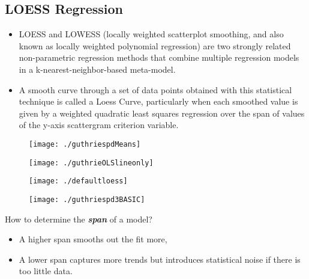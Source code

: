 \documentclass[12pt]{article}
\begin{document}
\newpage

\subsection*{LOESS Regression}

\begin{itemize}
\item LOESS and LOWESS (locally weighted scatterplot smoothing, and also known as locally weighted polynomial regression) are two strongly related non-parametric regression methods that combine multiple regression models in a k-nearest-neighbor-based meta-model.
\item A smooth curve through a set of data points obtained with this statistical technique is called a Loess Curve, particularly when each smoothed value is given by a weighted quadratic least squares regression over the span of values of the y-axis scattergram criterion variable. 
\end{itemize}

\begin{figure}[h!]
\centering
\texttt{[image: ./guthriespdMeans]}
\label{fig:guthriespdMeans}
\end{figure}
\newpage
\begin{figure}[h!]
\centering
\texttt{[image: ./guthrieOLSlineonly]}
\label{fig:guthrieOLSlineonly}
\end{figure}


\begin{figure}[h!]
\centering
\texttt{[image: ./defaultloess]}
\caption{}
\label{fig:defaultloess}
\end{figure}

\begin{figure}[h!]
\centering
\texttt{[image: ./guthriespd3BASIC]}
\caption{}
\label{fig:guthriespd3BASIC}
\end{figure}
\newpage

How to determine the \textit{\textbf{span}} of a model? 
\begin{itemize}
\item A higher span smooths out the fit more, 
\item A lower span captures more trends but introduces statistical noise if there is too little data. 
\end{itemize}

\newpage
\end{document}
